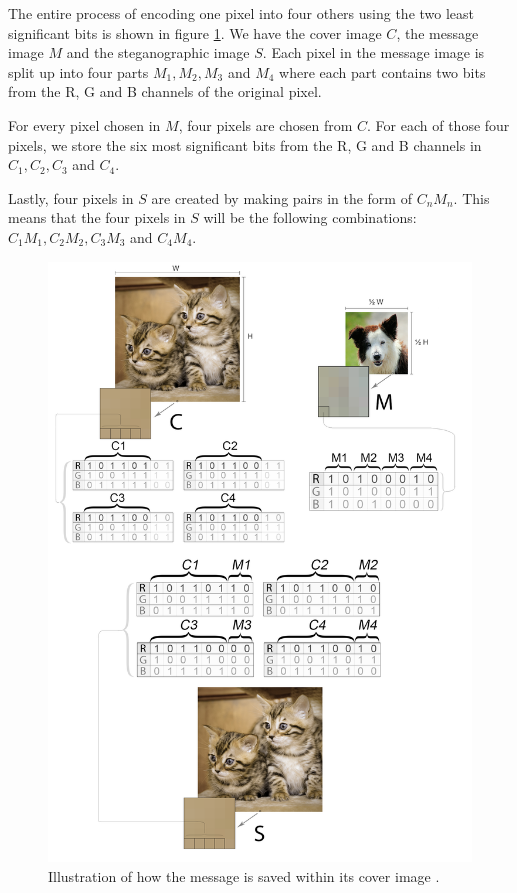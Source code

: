 The entire process of encoding one pixel into four others using the two least significant bits is shown in figure \ref{fig:hundigrafik}.
We have the cover image $C$, the message image $M$ and the steganographic image $S$.
Each pixel in the message image is split up into four parts $M_1, M_2, M_3$ and $M_4$ where each part contains two bits from the R, G and B channels of the original pixel.

For every pixel chosen in $M$, four pixels are chosen from $C$.
For each of those four pixels, we store the six most significant bits from the R, G and B channels in $C_1, C_2, C_3$ and $C_4$.

Lastly, four pixels in $S$ are created by making pairs in the form of $C_nM_n$.
This means that the four pixels in $S$ will be the following combinations: $C_1M_1,C_2M_2,C_3M_3$ and $C_4M_4$.

\begin{figure}
	\centering
	\includegraphics[width=1\textwidth]{figures/hundikatgrafik.png}
	\caption{Illustration of how the message is saved within its cover image \citep{LSBFigureCat,LSBFigureDog}.}
	\label{fig:hundigrafik}
\end{figure}

